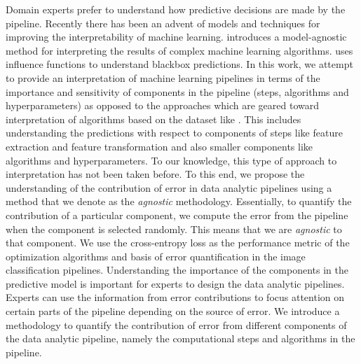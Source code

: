 Domain experts prefer to understand how predictive decisions are made by the pipeline. Recently there has been an advent of models and techniques for improving the interpretability of machine learning. \cite{ribeiro2016model} introduces a model-agnostic method for interpreting the results of complex machine learning algorithms. 
\cite{koh2017understanding} uses influence functions to understand blackbox predictions. In this work, we attempt to provide an interpretation of machine learning pipelines in terms of the importance and sensitivity of components in the pipeline (steps, algorithms and hyperparameters) as opposed to the approaches which are geared toward interpretation of algorithms based on the dataset like \cite{koh2017understanding}. This includes understanding the predictions with respect to components of steps like feature extraction and feature transformation and also smaller components like algorithms and hyperparameters. To our knowledge, this type of approach to interpretation has not been taken before.
To this end, we propose the understanding of the contribution of error in data analytic pipelines using a method that we denote as the \textit{agnostic} methodology. Essentially, to quantify the contribution of a particular component, we compute the error from the pipeline when the component is selected randomly. This means that we are \textit{agnostic} to that component. We use the cross-entropy loss as the performance metric of the optimization algorithms and basis of error quantification in the image classification pipelines. 
Understanding the importance of the components in the predictive model is important for experts to design the data analytic pipelines. 
Experts can use the information from error contributions to focus attention on certain parts of the pipeline depending on the source of error. 
We introduce a methodology to quantify the contribution of error from different components of the data analytic pipeline, namely the computational steps and algorithms in the pipeline. 


